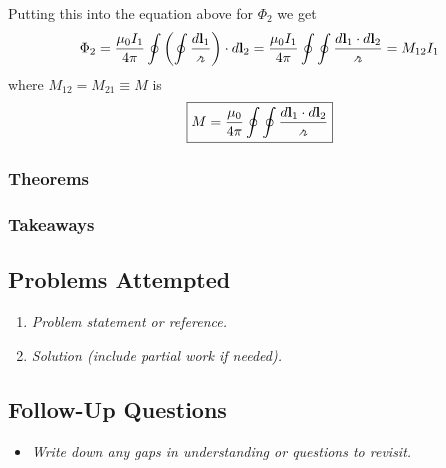 Putting this into the equation above for \(\Phi _2\) we get \begin{align*}
    \Phi_2 = \frac{\mu _0 I_1}{4 \pi }\oint \left( \oint \frac{d \mathbf{l}_1}{\griffr[2] } \right) \cdot d \mathbf{l}_2 = \frac{\mu _0 I_1}{4 \pi } \oint\oint \frac{d \mathbf{l}_1 \cdot d \mathbf{l}_2}{\griffr[2] } = M_{12} I_1 
\end{align*}
where \(M_{12} = M_{21} \equiv M\) is  \begin{align*}
    \boxed{M = \frac{\mu _0}{4 \pi } \oint\oint \frac{d \mathbf{l}_1 \cdot d \mathbf{l}_2}{\griffr[2] }}
\end{align*}
\subsubsection*{Theorems}
\subsubsection*{Takeaways}

\subsection*{Problems Attempted}
\begin{enumerate}
    \item \textit{Problem statement or reference.}
    \item \textit{Solution (include partial work if needed).}
\end{enumerate}

\subsection*{Follow-Up Questions}
\begin{itemize}
    \item \textit{Write down any gaps in understanding or questions to revisit.}
\end{itemize}
